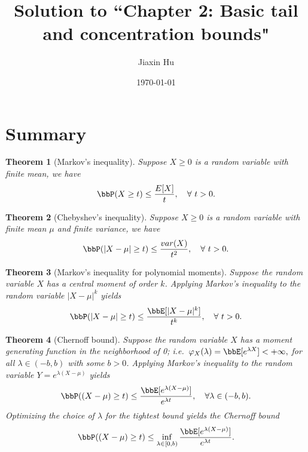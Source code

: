 \documentclass[11pt]{article}
\title{Solution to ``Chapter 2: Basic tail and concentration bounds"}
\date{\today}
\author{%
Jiaxin Hu
}
\theoremstyle{plain}
\newtheorem{thm}{Theorem}[section]
\theoremstyle{definition}
\begin{document}

\maketitle

\section{Summary}
\begin{thm}[Markov's inequality]\label{thm:markov}
	Suppose $X \geq 0$ is a random variable  with finite mean, we have
	\begin{equation}\label{eq:thmmarkov}
		\bbP(X\geq t) \leq \frac{E[X]}{t},\quad \forall \ t > 0.
	\end{equation}  
\end{thm}

\begin{thm}[Chebyshev's inequality]\label{thm:cheb}
	Suppose $X \geq 0$ is a random variable  with finite mean $\mu$ and finite variance, we have
	\begin{equation}\label{eq:cheby}
		\bbP(|X - \mu |\geq t) \leq \frac{var(X)}{t^2},\quad \forall \ t > 0.
	\end{equation}  
\end{thm}

\begin{thm}[Markov's inequality for polynomial moments]\label{thm:polymoment}
	Suppose the random variable $X$ has a central moment of order $k$. Applying Markov's inequality to the random variable $|X - \mu|^k$ yields
	\begin{equation}\label{eq:poly}
		\bbP(|X - \mu |\geq t) \leq \frac{\bbE[|X-\mu|^k]}{t^k},\quad \forall \ t > 0.
	\end{equation}  
\end{thm}

\begin{thm}[Chernoff bound]\label{thm:chernoff}
	Suppose the random variable $X$ has a moment generating function in the neighborhood of 0; i.e.\, $\varphi_X(\lambda) = \bbE[e^{\lambda X}] < +\infty,$ for all $\lambda \in (-b,b)$ with some $b>0$. Applying Markov's inequality to the random variable $Y = e^{\lambda(X- \mu)}$ yields
	\begin{equation}\label{eq:chernoff1}
		\bbP((X - \mu) \geq t) \leq \frac{\bbE[e^{\lambda (X-\mu)}]}{e^{\lambda t}}, \quad \forall \lambda\in (-b,b).
	\end{equation}
	Optimizing the choice of $\lambda$ for the tightest bound yields the Chernoff bound
	\begin{equation}\label{eq:chernoff2}
		\bbP((X - \mu) \geq t) \leq \inf_{\lambda \in [0,b)} \frac{\bbE[e^{\lambda (X-\mu)}]}{e^{\lambda t}}.
	\end{equation}
\end{thm}
\end{document}
